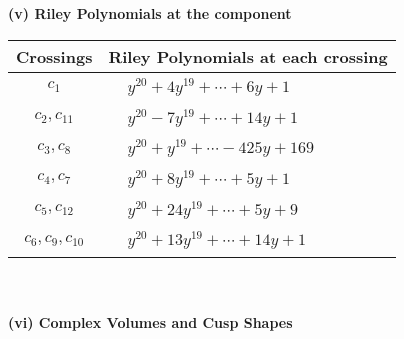 \documentclass[1p]{elsarticle_modified}
\theoremstyle{definition}
\begin{document}
\newpage\renewcommand{\arraystretch}{1}
\flushleft \textbf{(v) Riley Polynomials at the component}\newline \\
\begin{tabular}{m{50pt}|m{274pt}}
Crossings & \hspace{64pt}Riley Polynomials at each crossing \\
\hline $$\begin{aligned}c_{1}\end{aligned}$$&$\begin{aligned}
&y^{20}+4 y^{19}+\cdots+6 y+1
\end{aligned}$\\
\hline $$\begin{aligned}c_{2},c_{11}\end{aligned}$$&$\begin{aligned}
&y^{20}-7 y^{19}+\cdots+14 y+1
\end{aligned}$\\
\hline $$\begin{aligned}c_{3},c_{8}\end{aligned}$$&$\begin{aligned}
&y^{20}+y^{19}+\cdots-425 y+169
\end{aligned}$\\
\hline $$\begin{aligned}c_{4},c_{7}\end{aligned}$$&$\begin{aligned}
&y^{20}+8 y^{19}+\cdots+5 y+1
\end{aligned}$\\
\hline $$\begin{aligned}c_{5},c_{12}\end{aligned}$$&$\begin{aligned}
&y^{20}+24 y^{19}+\cdots+5 y+9
\end{aligned}$\\
\hline $$\begin{aligned}c_{6},c_{9},c_{10}\end{aligned}$$&$\begin{aligned}
&y^{20}+13 y^{19}+\cdots+14 y+1
\end{aligned}$\\
\hline
\end{tabular}\\~\\
\newpage\flushleft \textbf{(vi) Complex Volumes and Cusp Shapes}
\end{document}
